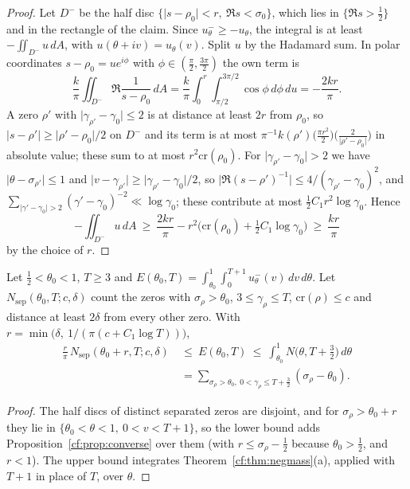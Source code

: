 \begin{proof}
Let $D^-$ be the half disc $\{\lvert s-\rho_0\rvert<r,\ \Re s<\sigma_0\}$, which lies in $\{\Re s>\frac12\}$ and in the rectangle of the claim. Since $u^-_\theta\ge-u_\theta$, the integral is at least $-\iint_{D^-}u\,dA$, with $u(\theta+iv)=u_\theta(v)$. Split $u$ by the Hadamard sum. In polar coordinates $s-\rho_0=ue^{i\phi}$ with $\phi\in(\frac\pi2,\frac{3\pi}2)$ the own term is
\[
\frac k\pi\iint_{D^-}\Re\frac1{s-\rho_0}\,dA=\frac k\pi\int_0^r\!\!\int_{\pi/2}^{3\pi/2}\cos\phi\,d\phi\,du=-\frac{2kr}\pi.
\]
A zero $\rho'$ with $\lvert\gamma_{\rho'}-\gamma_0\rvert\le2$ is at distance at least $2r$ from $\rho_0$, so $\lvert s-\rho'\rvert\ge\lvert\rho'-\rho_0\rvert/2$ on $D^-$ and its term is at most $\pi^{-1}k(\rho')\bigl(\frac{\pi r^2}2\bigr)\bigl(\frac2{\lvert\rho'-\rho_0\rvert}\bigr)$ in absolute value; these sum to at most $r^2\mathrm{cr}(\rho_0)$. For $\lvert\gamma_{\rho'}-\gamma_0\rvert>2$ we have $\lvert\theta-\sigma_{\rho'}\rvert\le1$ and $\lvert v-\gamma_{\rho'}\rvert\ge\lvert\gamma_{\rho'}-\gamma_0\rvert/2$, so $\lvert\Re(s-\rho')^{-1}\rvert\le4/(\gamma_{\rho'}-\gamma_0)^2$, and $\sum_{\lvert\gamma'-\gamma_0\rvert>2}(\gamma'-\gamma_0)^{-2}\ll\log\gamma_0$; these contribute at most $\frac12C_1r^2\log\gamma_0$. Hence
\[
-\iint_{D^-}u\,dA\ \ge\ \frac{2kr}\pi-r^2\bigl(\mathrm{cr}(\rho_0)+\tfrac12C_1\log\gamma_0\bigr)\ \ge\ \frac{kr}\pi
\]
by the choice of $r$.
\end{proof}

\begin{corollary}\label{cf:cor:twosided}
Let $\frac12<\theta_0<1$, $T\ge3$ and $E(\theta_0,T)=\int_{\theta_0}^1\int_0^{T+1}u_\theta^-(v)\,dv\,d\theta$. Let $N_{\mathrm{sep}}(\theta_0,T;c,\delta)$ count the zeros with $\sigma_\rho>\theta_0$, $3\le\gamma_\rho\le T$, $\mathrm{cr}(\rho)\le c$ and distance at least $2\delta$ from every other zero. With $r=\min\bigl(\delta,\ 1/(\pi(c+C_1\log T))\bigr)$,
\[
\begin{split}
\frac r\pi\,N_{\mathrm{sep}}(\theta_0+r,T;c,\delta)\ &\le\ E(\theta_0,T)\ \le\ \int_{\theta_0}^1N\bigl(\theta,T+\tfrac32\bigr)\,d\theta\\
&=\sum_{\sigma_\rho>\theta_0,\ 0<\gamma_\rho\le T+\frac32}(\sigma_\rho-\theta_0).
\end{split}
\]
\end{corollary}

\begin{proof}
The half discs of distinct separated zeros are disjoint, and for $\sigma_\rho>\theta_0+r$ they lie in $\{\theta_0<\theta<1,\ 0<v<T+1\}$, so the lower bound adds Proposition~\ref{cf:prop:converse} over them (with $r\le\sigma_\rho-\frac12$ because $\theta_0>\frac12$, and $r<1$). The upper bound integrates Theorem~\ref{cf:thm:negmass}(a), applied with $T+1$ in place of $T$, over $\theta$.
\end{proof}

